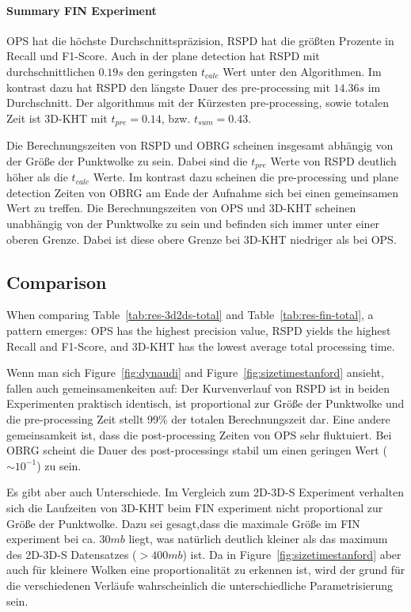 \documentclass[main.tex]{subfiles}
\begin{document}
\paragraph{Summary FIN Experiment}
OPS hat die höchste Durchschnittspräzision, RSPD hat die größten Prozente in Recall und F1-Score. Auch in der plane detection
hat RSPD mit durchschnittlichen $0.19s$ den geringsten $t_{calc}$ Wert unter den Algorithmen. Im kontrast dazu hat RSPD
den längste Dauer des pre-processing mit $14.36s$ im Durchschnitt. Der algorithmus mit der Kürzesten pre-processing, sowie
totalen Zeit ist 3D-KHT mit $t_{pre}=0.14$, bzw. $t_{sum}=0.43$.

Die Berechnungszeiten von RSPD und OBRG scheinen insgesamt abhängig von der Größe der Punktwolke zu sein.
Dabei sind die $t_{pre}$ Werte von RSPD deutlich höher als die $t_{calc}$ Werte. Im kontrast dazu scheinen die pre-processing
und plane detection Zeiten von OBRG am Ende der Aufnahme sich bei einen gemeinsamen Wert zu treffen.
Die Berechnungszeiten von OPS und 3D-KHT scheinen unabhängig von der Punktwolke zu sein und befinden sich immer unter einer 
oberen Grenze. Dabei ist diese obere Grenze bei 3D-KHT niedriger als bei OPS.


\subsection{Comparison}
When comparing Table~\ref{tab:res-3d2ds-total} and Table~\ref{tab:res-fin-total}, a pattern emerges:
OPS has the highest precision value, RSPD yields the highest Recall and F1-Score, and 3D-KHT has the lowest
average total processing time.

Wenn man sich Figure~\ref{fig:dynaudi} and Figure~\ref{fig:sizetimestanford} ansieht, fallen auch gemeinsamenkeiten auf:
Der Kurvenverlauf von RSPD ist in beiden Experimenten praktisch identisch, ist proportional zur Größe der Punktwolke
und die pre-processing Zeit stellt 99\% der totalen Berechnungszeit dar.
Eine andere gemeinsamkeit ist, dass die post-processing Zeiten von OPS sehr fluktuiert. Bei OBRG scheint die Dauer des
post-processings stabil um einen geringen Wert (${\sim}10^{-1}$) zu sein.

Es gibt aber auch Unterschiede. Im Vergleich zum 2D-3D-S Experiment verhalten sich die Laufzeiten von 3D-KHT beim
FIN experiment nicht proportional zur Größe der Punktwolke. Dazu sei gesagt,dass die maximale Größe im FIN experiment
bei ca. $30mb$ liegt, was natürlich deutlich kleiner als das maximum des 2D-3D-S Datensatzes (${>}400mb$) ist.
Da in Figure~\ref{fig:sizetimestanford} aber auch für kleinere Wolken eine proportionalität zu erkennen ist, wird
der grund für die verschiedenen Verläufe wahrscheinlich die unterschiedliche Parametrisierung sein.
\end{document}
